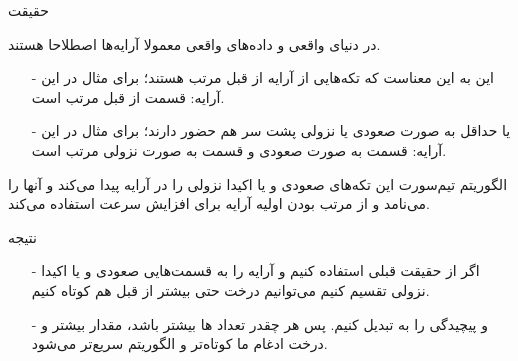 \begin{frame}{حقیقت}
\begin{center}
{\large در دنیای واقعی و داده‌های واقعی معمولا آرایه‌ها اصطلاحا 
هستند.}
\end{center}
\begin{itemize}\itemr
\item[-]
این به این معناست که تکه‌هایی از آرایه از قبل مرتب هستند؛ برای مثال در این آرایه:
\m{[5, 4, 1, 2, 3]}
قسمت 
\m{[1, 2, 3]}
از قبل مرتب است.
\item[-]
یا حداقل به صورت صعودی یا نزولی پشت سر هم حضور دارند؛ برای مثال در این آرایه:
\m{[6, 4, 1, 2, 3, 5, 7]}
قسمت
\m{[1, 2, 3, 5, 7]}
به صورت صعودی و قسمت 
\m{[6, 4]}
به صورت نزولی مرتب است.
\end{itemize}

\begin{center}
{\large الگوریتم تیم‌سورت این تکه‌های صعودی و یا اکیدا نزولی را در آرایه پیدا می‌کند و آنها را  می‌نامد و از مرتب بودن اولیه آرایه برای افزایش سرعت استفاده می‌کند.}
\end{center}
\end{frame}

\begin{frame}{نتیجه}
\begin{itemize}\itemr
\item[-]
اگر از حقیقت قبلی استفاده کنیم و آرایه را به قسمت‌هایی صعودی و یا اکیدا نزولی تقسیم کنیم می‌توانیم درخت  حتی بیشتر از قبل هم کوتاه کنیم.

\item[-]
و پیچیدگی را به 
تبدیل کنیم. پس هر چقدر تعداد ها بیشتر باشد، مقدار  بیشتر و درخت ادغام ما کوتاه‌تر و الگوریتم سریع‌تر می‌شود.
\end{itemize}
\end{frame}
